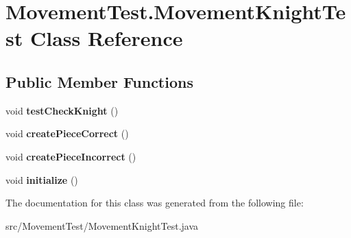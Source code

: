 \hypertarget{class_movement_test_1_1_movement_knight_test}{\section{Movement\-Test.\-Movement\-Knight\-Test Class Reference}
\label{class_movement_test_1_1_movement_knight_test}
}
\subsection*{Public Member Functions}
\begin{DoxyCompactItemize}
\item 
\hypertarget{class_movement_test_1_1_movement_knight_test_a161801a94314b220f337ebfd482a5644}{void {\bfseries test\-Check\-Knight} ()}\label{class_movement_test_1_1_movement_knight_test_a161801a94314b220f337ebfd482a5644}

\item 
\hypertarget{class_movement_test_1_1_movement_knight_test_a295fa2dc83434b03156dea0bbf30a6ad}{void {\bfseries create\-Piece\-Correct} ()}\label{class_movement_test_1_1_movement_knight_test_a295fa2dc83434b03156dea0bbf30a6ad}

\item 
\hypertarget{class_movement_test_1_1_movement_knight_test_a9e9a1fe33f3d4389457eb4e51a702247}{void {\bfseries create\-Piece\-Incorrect} ()}\label{class_movement_test_1_1_movement_knight_test_a9e9a1fe33f3d4389457eb4e51a702247}

\item 
\hypertarget{class_movement_test_1_1_movement_knight_test_aef515bbfbed8a8dae7acab3c03729ba6}{void {\bfseries initialize} ()}\label{class_movement_test_1_1_movement_knight_test_aef515bbfbed8a8dae7acab3c03729ba6}

\end{DoxyCompactItemize}


The documentation for this class was generated from the following file\-:\begin{DoxyCompactItemize}
\item 
src/\-Movement\-Test/Movement\-Knight\-Test.\-java\end{DoxyCompactItemize}
